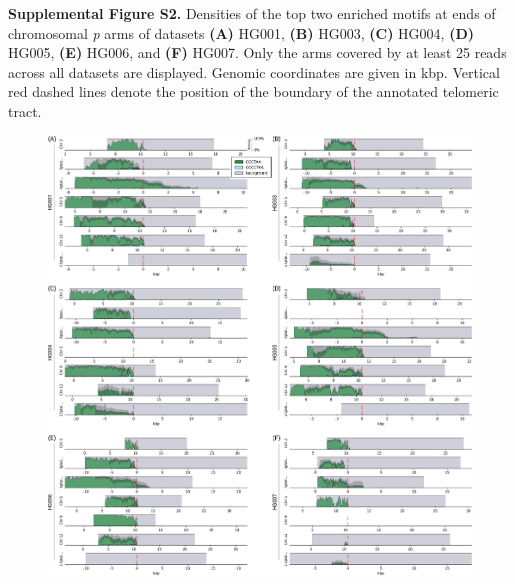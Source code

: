 \documentclass{article}
\begin{document}

\begin{samepage}
\noindent \textbf{Supplemental Figure S2.}
Densities of the top two enriched motifs at ends of chromosomal \textit{p} arms of datasets
\textbf{(A)} HG001,
\textbf{(B)} HG003,
\textbf{(C)} HG004,
\textbf{(D)} HG005,
\textbf{(E)} HG006, and
\textbf{(F)} HG007.
Only the arms covered by at least 25 reads across all datasets are displayed.
Genomic coordinates are given in kbp.
Vertical red dashed lines denote the position of the boundary of the annotated telomeric tract.

\begin{figure}[ht!] \centering
\includegraphics[width=\textwidth,keepaspectratio]{Figure_S2-nolegend.pdf}
\end{figure}
\end{samepage}
\end{document}
